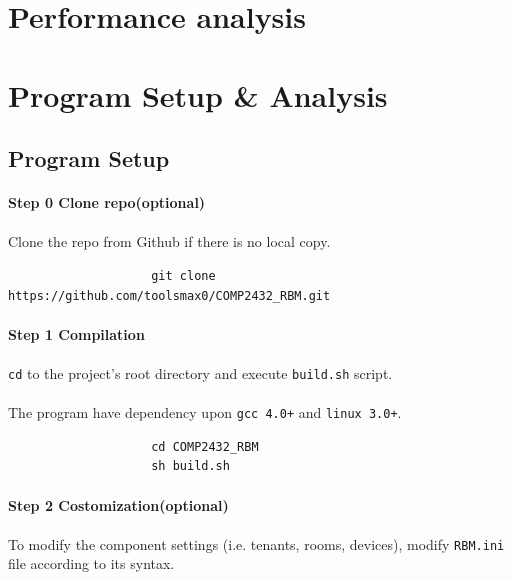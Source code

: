 \documentclass{article}
\begin{document}
    \cleardoublepage
    \section{Performance analysis}

    \cleardoublepage
    \section{Program Setup \& Analysis}
        \subsection{Program Setup}
            \paragraph{Step 0 Clone repo(optional)}
            \paragraph{}
                Clone the repo from Github if there is no local copy.
                \begin{verbatim}
                    git clone https://github.com/toolsmax0/COMP2432_RBM.git
                \end{verbatim}
            \paragraph{Step 1 Compilation}
            \paragraph{}
                \texttt{cd} to the project's root directory and execute \texttt{build.sh} script.
            \paragraph{}
                The program have dependency upon \texttt{gcc 4.0+} and \texttt{linux 3.0+}.
                \begin{verbatim}
                    cd COMP2432_RBM
                    sh build.sh
                \end{verbatim}
            \paragraph{Step 2 Costomization(optional)}
            \paragraph{}
                To modify the component settings (i.e. tenants, rooms, devices),
                modify \texttt{RBM.ini} file according to its syntax.
\end{document}
